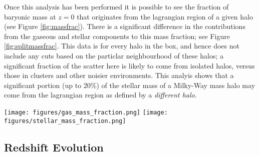 Once this analysis has been performed it is possible to see the fraction of baryonic mass at $z=0$ that originates from the lagrangian region of a given halo (see Figure \ref{fig:massfrac}). There is a significant difference in the contributions from the gaseous and stellar components to this mass fraction; see Figure \ref{fig:splitmassfrac}. This data is for every halo in the box, and hence does not include any cuts based on the particlar neighbourhood of these halos; a significant fraction of the scatter here is likely to come from isolated halos, versus those in clusters and other noisier environments. This analyis shows that a significant portion (up to 20\%) of the stellar mass of a Milky-Way mass halo may come from the lagrangian region as defined by a \emph{different halo}.


\begin{figure*}
    \centering
    \texttt{[image: figures/gas\_mass\_fraction.png]}
    \texttt{[image: figures/stellar\_mass\_fraction.png]}
    \caption{Left: fraction of gaseous mass at $z=0$ in each halo from each component; right: fraction of stellar mass at $z=0$ from each component. Note that there is significantly more transfer shown in the gaseous component. Gas that is transferred between lagrangian regions must be given time to cool before being able to form stars. As the events that enable transfer are typically very energetic (AGN, stellar feedback, accretion), it is unlikely that the cooling time will be short enough to form stars by the end of the simulation for most transfer.}
    \label{fig:splitmassfrac}
\end{figure*}

\subsection{Redshift Evolution}

